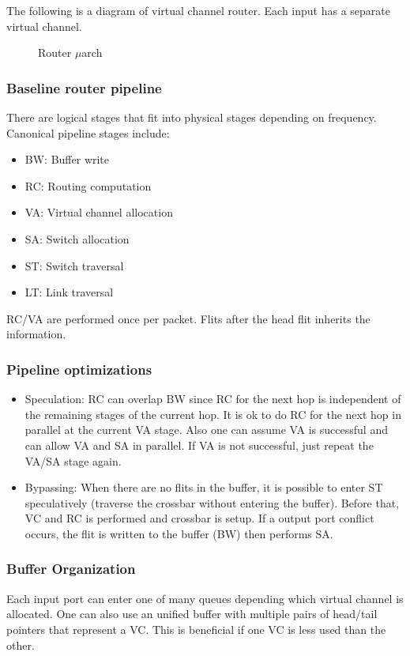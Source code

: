 \documentclass{article}
\begin{document}
\begin{multicols*}{2}
The following is a diagram of virtual channel router. Each input has a separate virtual channel.

\begin{figure}[H]
    \caption{Router $\mu$arch}
\end{figure}  

\subsubsection{Baseline router pipeline}
There are logical stages that fit into physical stages depending on frequency. Canonical pipeline stages include:
\begin{itemize}
    \item BW: Buffer write
    \item RC: Routing computation
    \item VA: Virtual channel allocation
    \item SA: Switch allocation
    \item ST: Switch traversal
    \item LT: Link traversal
\end{itemize}

\noindent\newline
RC/VA are performed once per packet. Flits after the head flit inherits the information.

\subsubsection{Pipeline optimizations}
\begin{itemize}
    \item Speculation: RC can overlap BW since RC for the next hop is independent of the remaining stages of the current hop. It is ok to do RC for the next hop in parallel at the current VA stage. Also one can assume VA is successful and can allow VA and SA in parallel. If VA is not successful, just repeat the VA/SA stage again.
    \item Bypassing: When there are no flits in the buffer, it is possible to enter ST speculatively (traverse the crossbar without entering the buffer). Before that, VC and RC is performed and crossbar is setup. If a output port conflict occurs, the flit is written to the buffer (BW) then performs SA.
\end{itemize}

\subsubsection{Buffer Organization}
Each input port can enter one of many queues depending which virtual channel is allocated. One can also use an unified buffer with multiple pairs of head/tail pointers that represent a VC. This is beneficial if one VC is less used than the other.


\end{multicols*}
\end{document}
